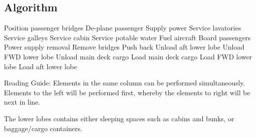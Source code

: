 \subsection{Algorithm}
Position passenger bridges
	De-plane passenger
	Supply power
		Service lavatories
		Service galleys
		Service cabin
		Service potable water
		Fuel aircraft
			Board passengers
				Power supply removal
				Remove bridges
					Push back
	Unload aft lower lobe
	Unload FWD lower lobe
		Unload main deck cargo
			Load main deck cargo
			Load FWD lower lobe
			Load aft lower lobe
			  
			
Reading Guide:
	Elements in the same column can be performed simultaneously. 
	Elements to the left will be performed first, whereby the elements to right will be next in line.
	
The lower lobes contains either sleeping spaces such as cabins and bunks, or baggage/cargo containers\cite{Algo_lobe}.